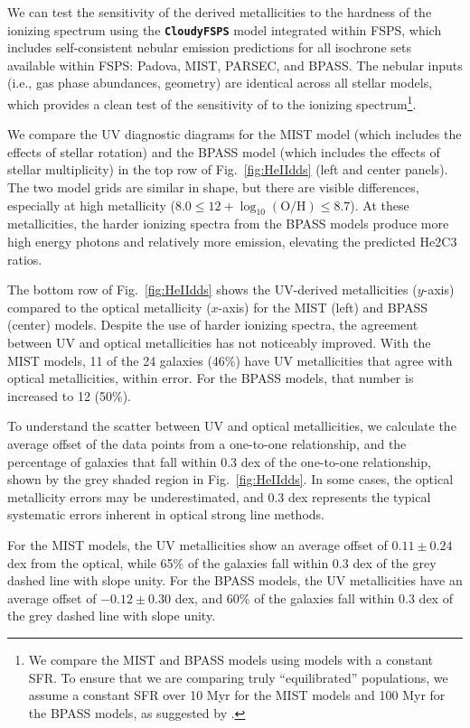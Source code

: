 \documentclass[trackchanges, preprint2]{aastex62}
\newcommand{\FSPS}{{\sc FSPS}\xspace}
\newcommand{\CloudyFSPS}{{\tt \textbf{CloudyFSPS}}\xspace}
\newcommand{\heii}{\ion{He}{2}}
\newcommand{\Myr}{$\,$Myr\xspace}
\newcommand{\logten}{\ensuremath{\log_{10}}}
\newcommand{\logOH}{\ensuremath{\logten (\mathrm{O}/\mathrm{H})}\xspace}
\begin{document}
We can test the sensitivity of the derived metallicities to the hardness of the ionizing spectrum using the \CloudyFSPS model integrated within \FSPS \citep{Byler+2017}, which includes self-consistent nebular emission predictions for all isochrone sets available within FSPS: Padova, MIST, PARSEC, and BPASS. The nebular inputs (i.e., gas phase abundances, geometry) are identical across all stellar models, which provides a clean test of the sensitivity of \heii{} to the ionizing spectrum\footnote{We compare the MIST and BPASS models using models with a constant SFR. To ensure that we are comparing truly ``equilibrated'' populations, we assume a constant SFR over 10\,\Myr for the MIST models and 100\,\Myr for the BPASS models, as suggested by \citet{Xiao+2018}.}.

We compare the UV diagnostic diagrams for the MIST model (which includes the effects of stellar rotation) and the BPASS model (which includes the effects of stellar multiplicity) in the top row of Fig.~\ref{fig:HeIIdds} (left and center panels). The two model grids are similar in shape, but there are visible differences, especially at high metallicity ($8.0 \leq 12+\logOH \leq 8.7$). At these metallicities, the harder ionizing spectra from the BPASS models produce more high energy photons and relatively more \heii{} emission, elevating the predicted He2C3 ratios.

The bottom row of Fig.~\ref{fig:HeIIdds} shows the UV-derived metallicities ($y$-axis) compared to the optical metallicity ($x$-axis) for the MIST (left) and BPASS (center) models. Despite the use of harder ionizing spectra, the agreement between UV and optical metallicities has not noticeably improved. With the MIST models, 11 of the 24 galaxies (46\%) have UV metallicities that agree with optical metallicities, within error. For the BPASS models, that number is increased to 12 (50\%). 

To understand the scatter between UV and optical metallicities, we calculate the average offset of the data points from a one-to-one relationship, and the percentage of galaxies that fall within $0.3$ dex of the one-to-one relationship, shown by the grey shaded region in Fig.~\ref{fig:HeIIdds}. In some cases, the optical metallicity errors may be underestimated, and 0.3 dex represents the typical systematic errors inherent in optical strong line methods.

For the MIST models, the UV metallicities show an average offset of $0.11 \pm 0.24$ dex from the optical, while 65\% of the galaxies fall within 0.3 dex of the grey dashed line with slope unity. For the BPASS models, the UV metallicities have an average offset of $-0.12 \pm 0.30$ dex, and 60\% of the galaxies fall within 0.3 dex of the grey dashed line with slope unity.
\end{document}
